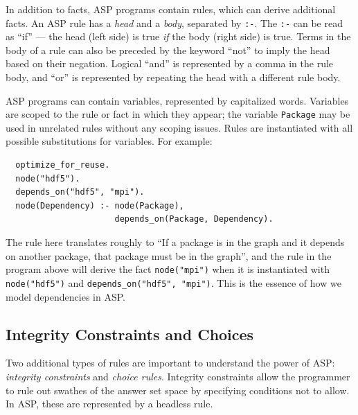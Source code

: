 In addition to facts, ASP programs contain rules, which can derive additional facts. An
ASP rule has a {\it head} and a {\it body}, separated by \texttt{:-}. The \texttt{:-}
can be read as ``if'' --- the head (left side) is true {\it if} the body (right side) is true.
Terms in the body of a rule can also be preceded by the keyword ``not'' to imply the
head based on their negation. Logical ``and'' is represented by a comma in the rule
body, and ``or'' is represented by repeating the head with a different rule body.

ASP programs can contain variables, represented by capitalized words. Variables are
scoped to the rule or fact in which they appear; the variable {\tt Package} may be used
in unrelated rules without any scoping issues. Rules are instantiated with all possible
substitutions for variables. For example:


\begin{verbatim}
  optimize_for_reuse.
  node("hdf5").
  depends_on("hdf5", "mpi").
  node(Dependency) :- node(Package),
                      depends_on(Package, Dependency).
\end{verbatim}

The rule here translates roughly to ``If a package is in the graph and it depends on
another package, that package must be in the graph'', and the rule in the program above
will derive the fact {\tt node("mpi")} when it is instantiated with {\tt
  node("hdf5")} and {\tt depends\_on("hdf5", "mpi")}. This is the essence of how
  we model dependencies in ASP.

\subsection{Integrity Constraints and Choices}

Two additional types of rules are important to understand the power of ASP:
\textit{integrity constraints} and \textit{choice rules}.
Integrity constraints allow the programmer to rule out swathes of the answer set space
by specifying conditions not to allow. In ASP, these are represented by a headless rule.


